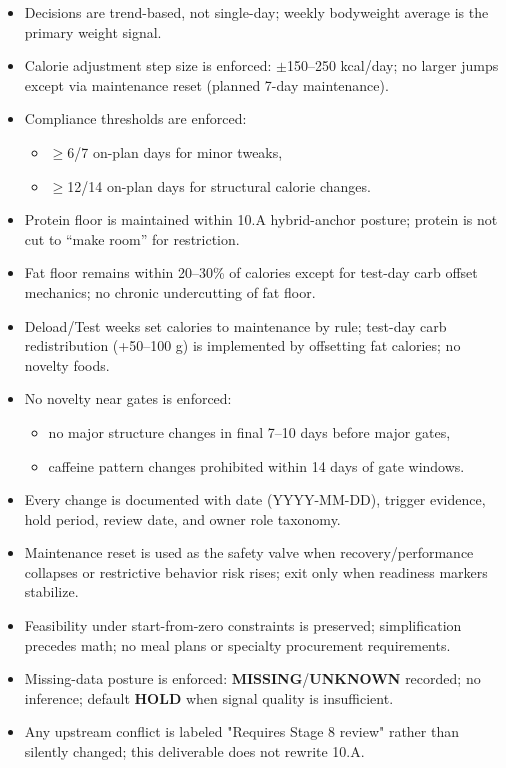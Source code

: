 \documentclass[10pt]{article}
\begin{document}
\begin{itemize}
\item Decisions are trend-based, not single-day; weekly bodyweight average is the primary weight signal.
\item Calorie adjustment step size is enforced: $\pm$150–250 kcal/day; no larger jumps except via maintenance reset (planned 7-day maintenance).
\item Compliance thresholds are enforced:
\begin{itemize}
\item $\geq$6/7 on-plan days for minor tweaks,
\item $\geq$12/14 on-plan days for structural calorie changes.
\end{itemize}
\item Protein floor is maintained within 10.A hybrid-anchor posture; protein is not cut to “make room” for restriction.
\item Fat floor remains within 20–30\% of calories except for test-day carb offset mechanics; no chronic undercutting of fat floor.
\item Deload/Test weeks set calories to maintenance by rule; test-day carb redistribution (+50–100 g) is implemented by offsetting fat calories; no novelty foods.
\item No novelty near gates is enforced:
\begin{itemize}
\item no major structure changes in final 7–10 days before major gates,
\item caffeine pattern changes prohibited within 14 days of gate windows.
\end{itemize}
\item Every change is documented with date (YYYY-MM-DD), trigger evidence, hold period, review date, and owner role taxonomy.
\item Maintenance reset is used as the safety valve when recovery/performance collapses or restrictive behavior risk rises; exit only when readiness markers stabilize.
\item Feasibility under start-from-zero constraints is preserved; simplification precedes math; no meal plans or specialty procurement requirements.
\item Missing-data posture is enforced: \textbf{MISSING}/\textbf{UNKNOWN} recorded; no inference; default \textbf{HOLD} when signal quality is insufficient.
\item Any upstream conflict is labeled "Requires Stage 8 review" rather than silently changed; this deliverable does not rewrite 10.A.
\end{itemize}
\end{document}
